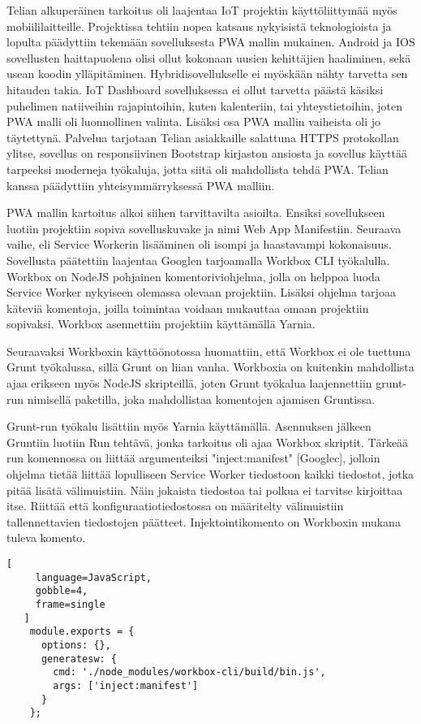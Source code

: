 \documentclass{tktltiki}
\begin{document}
Telian alkuperäinen tarkoitus oli laajentaa IoT projektin käyttöliittymää myös mobiililaitteille. Projektissa tehtiin nopea katsaus nykyisistä teknologioista ja lopulta päädyttiin tekemään sovelluksesta PWA mallin mukainen. Android ja IOS sovellusten haittapuolena olisi ollut kokonaan uusien kehittäjien haaliminen, sekä usean koodin ylläpitäminen. Hybridisovellukselle ei myöskään nähty tarvetta sen hitauden takia. IoT Dashboard sovelluksessa ei ollut tarvetta päästä käsiksi puhelimen natiiveihin rajapintoihin, kuten kalenteriin, tai yhteystietoihin, joten PWA malli oli luonnollinen valinta. Lisäksi osa PWA mallin vaiheista oli jo täytettynä. Palvelua tarjotaan Telian asiakkaille salattuna HTTPS protokollan ylitse, sovellus on responsiivinen Bootstrap kirjaston ansiosta ja sovellus käyttää tarpeeksi moderneja työkaluja, jotta siitä oli mahdollista tehdä PWA. Telian kanssa päädyttiin yhteisymmärryksessä PWA malliin. 

PWA mallin kartoitus alkoi siihen tarvittavilta asioilta. Ensiksi sovellukseen luotiin projektiin sopiva sovelluskuvake ja nimi Web App Manifestiin. Seuraava vaihe, eli Service Workerin lisääminen oli isompi ja haastavampi kokonaisuus. Sovellusta päätettiin laajentaa Googlen tarjoamalla Workbox CLI työkalulla. Workbox on NodeJS pohjainen komentoriviohjelma, jolla on helppoa luoda Service Worker nykyiseen olemassa olevaan projektiin. Lisäksi ohjelma tarjoaa käteviä komentoja, joilla toimintaa voidaan mukauttaa omaan projektiin sopivaksi. Workbox asennettiin projektiin käyttämällä Yarnia.

Seuraavaksi Workboxin käyttöönotossa huomattiin, että Workbox ei ole tuettuna Grunt työkalussa, sillä Grunt on liian vanha. Workboxia on kuitenkin mahdollista ajaa erikseen myös NodeJS skripteillä, joten Grunt työkalua laajennettiin grunt-run nimisellä paketilla, joka mahdollistaa komentojen ajamisen Gruntissa. 

Grunt-run työkalu lisättiin myös Yarnia käyttämällä. Asennuksen jälkeen Gruntiin luotiin Run tehtävä, jonka tarkoitus oli ajaa Workbox skriptit. Tärkeää run komennossa on liittää argumenteiksi "inject:manifest" [Googlec], jolloin ohjelma tietää liittää lopulliseen Service Worker tiedostoon kaikki tiedostot, jotka pitää lisätä välimuistiin. Näin jokaista tiedostoa tai polkua ei tarvitse kirjoittaa itse. Riittää että konfiguraatiotiedostossa on määritelty välimuistiin tallennettavien tiedostojen päätteet. Injektointikomento on Workboxin mukana tuleva komento.

\begin{lstlisting}[
     language=JavaScript,
     gobble=4,
     frame=single
   ]
    module.exports = {
      options: {},
      generatesw: {
        cmd: './node_modules/workbox-cli/build/bin.js',
        args: ['inject:manifest']
      }
    };
\end{lstlisting}
\end{document}
